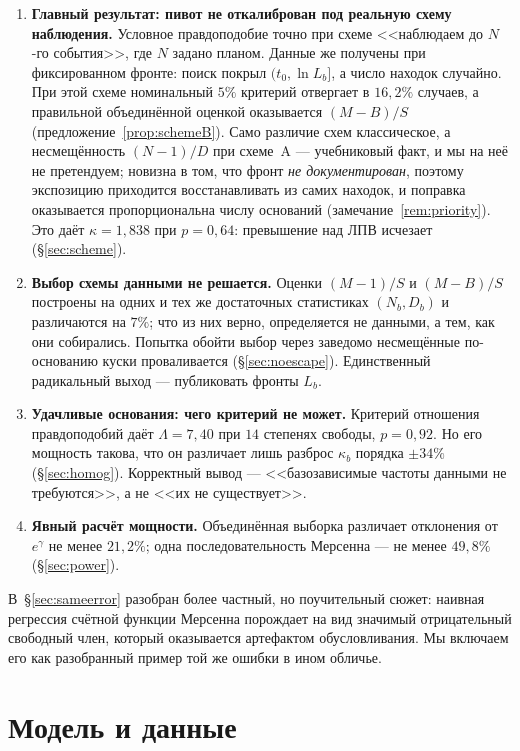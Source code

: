 \documentclass[11pt,a4paper]{article}
\theoremstyle{plain}
\theoremstyle{remark}
\newcommand{\eg}{e^{\gamma}}
\begin{document}
\begin{enumerate}
\item\textbf{Главный результат: пивот не откалиброван под реальную схему наблюдения.}
Условное правдоподобие точно при схеме <<наблюдаем до $N$-го события>>, где $N$ задано
планом. Данные же получены при фиксированном фронте: поиск покрыл $(t_0,\ln L_b]$, а число
находок случайно. При этой схеме номинальный $5\%$ критерий отвергает
в $16{,}2\%$ случаев, а правильной объединённой оценкой оказывается $(M-B)/S$
(предложение~\ref{prop:schemeB}). Само различие схем классическое, а несмещённость
$(N-1)/D$ при схеме~A --- учебниковый факт, и мы на неё не претендуем; новизна в том, что
фронт \emph{не документирован}, поэтому экспозицию приходится восстанавливать
из самих находок, и поправка оказывается пропорциональна числу оснований
(замечание~\ref{rem:priority}). Это даёт $\hat\kappa=1{,}838$ при $p=0{,}64$:
превышение над ЛПВ исчезает (\S\ref{sec:scheme}).

\item\textbf{Выбор схемы данными не решается.} Оценки $(M-1)/S$ и $(M-B)/S$ построены
на одних и тех же достаточных статистиках $(N_b,D_b)$ и различаются на $7\%$;
что из них верно, определяется не данными, а тем, как они собирались. Попытка обойти
выбор через заведомо несмещённые по-основанию куски проваливается
(\S\ref{sec:noescape}). Единственный радикальный выход --- публиковать фронты $L_b$.

\item\textbf{Удачливые основания: чего критерий не может.} Критерий отношения
правдоподобий даёт $\Lambda=7{,}40$ при $14$ степенях свободы, $p=0{,}92$. Но его
мощность такова, что он различает лишь разброс $\kappa_b$ порядка $\pm34\%$
(\S\ref{sec:homog}). Корректный вывод --- <<базозависимые частоты данными не
требуются>>, а не <<их не существует>>.

\item\textbf{Явный расчёт мощности.} Объединённая выборка различает отклонения от
$\eg$ не менее $21{,}2\%$; одна последовательность Мерсенна --- не менее $49{,}8\%$
(\S\ref{sec:power}).
\end{enumerate}

В~\S\ref{sec:sameerror} разобран более частный, но поучительный сюжет: наивная регрессия
счётной функции Мерсенна порождает на вид значимый отрицательный свободный член,
который оказывается артефактом обусловливания. Мы включаем его как разобранный пример
той же ошибки в ином обличье.

\section{Модель и данные}\label{sec:data}
\end{document}
